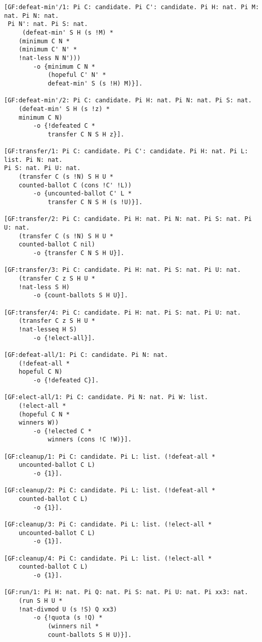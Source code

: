 \begin{lstlisting}[basicstyle=\footnotesize\ttfamily,numbers=none]
[GF:defeat-min'/1: Pi C: candidate. Pi C': candidate. Pi H: nat. Pi M: nat. Pi N: nat. 
 Pi N': nat. Pi S: nat. 
	 (defeat-min' S H (s !M) *
	(minimum C N *
	(minimum C' N' *
	!nat-less N N'))) 
		-o {minimum C N *
			(hopeful C' N' *
			defeat-min' S (s !H) M)}].

[GF:defeat-min'/2: Pi C: candidate. Pi H: nat. Pi N: nat. Pi S: nat.  
	(defeat-min' S H (s !z) *
	minimum C N) 
		-o {!defeated C *
			transfer C N S H z}].

[GF:transfer/1: Pi C: candidate. Pi C': candidate. Pi H: nat. Pi L: list. Pi N: nat.  
Pi S: nat. Pi U: nat. 
	(transfer C (s !N) S H U *
	counted-ballot C (cons !C' !L)) 
		-o {uncounted-ballot C' L *
			transfer C N S H (s !U)}].

[GF:transfer/2: Pi C: candidate. Pi H: nat. Pi N: nat. Pi S: nat. Pi U: nat. 
	(transfer C (s !N) S H U *
	counted-ballot C nil) 
		-o {transfer C N S H U}].

[GF:transfer/3: Pi C: candidate. Pi H: nat. Pi S: nat. Pi U: nat. 
	(transfer C z S H U *
	!nat-less S H) 
		-o {count-ballots S H U}].

[GF:transfer/4: Pi C: candidate. Pi H: nat. Pi S: nat. Pi U: nat. 
	(transfer C z S H U *
	!nat-lesseq H S) 
		-o {!elect-all}].

[GF:defeat-all/1: Pi C: candidate. Pi N: nat. 
	(!defeat-all *
	hopeful C N) 
		-o {!defeated C}].

[GF:elect-all/1: Pi C: candidate. Pi N: nat. Pi W: list.  
	(!elect-all *
	(hopeful C N *
	winners W)) 
		-o {!elected C *
			winners (cons !C !W)}].

[GF:cleanup/1: Pi C: candidate. Pi L: list. (!defeat-all *
	uncounted-ballot C L) 
		-o {1}].

[GF:cleanup/2: Pi C: candidate. Pi L: list. (!defeat-all *
	counted-ballot C L) 
		-o {1}].

[GF:cleanup/3: Pi C: candidate. Pi L: list. (!elect-all *
	uncounted-ballot C L) 
		-o {1}].

[GF:cleanup/4: Pi C: candidate. Pi L: list. (!elect-all *
	counted-ballot C L) 
		-o {1}].

[GF:run/1: Pi H: nat. Pi Q: nat. Pi S: nat. Pi U: nat. Pi xx3: nat. 
	(run S H U *
	!nat-divmod U (s !S) Q xx3) 
		-o {!quota (s !Q) *
			(winners nil *
			count-ballots S H U)}].
\end{lstlisting}
